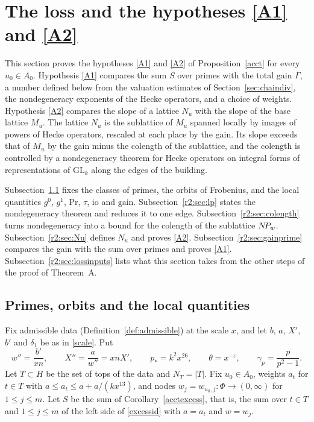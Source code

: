 
\section{The loss and the hypotheses \texorpdfstring{\eqref{A1} and \eqref{A2}}{(3.1) and (3.2)}}\label{r2:sec:loss}

This section proves the hypotheses \eqref{A1} and \eqref{A2} of Proposition~\ref{acct} for every $u_0\in A_0$. Hypothesis \eqref{A1} compares the sum $S$ over primes with the total gain $\Gamma$, a number defined below from the valuation estimates of Section~\ref{sec:chaindiv}, the nondegeneracy exponents of the Hecke operators, and a choice of weights. Hypothesis \eqref{A2} compares the slope of a lattice $N_u$ with the slope of the base lattice $M_u$. The lattice $N_u$ is the sublattice of $M_u$ spanned locally by images of powers of Hecke operators, rescaled at each place by the gain. Its slope exceeds that of $M_u$ by the gain minus the colength of the sublattice, and the colength is controlled by a nondegeneracy theorem for Hecke operators on integral forms of representations of $\mathrm{GL}_k$ along the edges of the building.

Subsection~\ref{r2:sec:loss-setting} fixes the classes of primes, the orbits of Frobenius, and the local quantities $g^0$, $g^1$, $\mathrm{Pr}$, $\tau$, $\mathrm{io}$ and $\mathrm{gain}$. Subsection~\ref{r2:sec:lp} states the nondegeneracy theorem and reduces it to one edge. Subsection~\ref{r2:sec:colength} turns nondegeneracy into a bound for the colength of the sublattice $N\!P_w$. Subsection~\ref{r2:sec:Nu} defines $N_u$ and proves \eqref{A2}. Subsection~\ref{r2:sec:gainprime} compares the gain with the sum over primes and proves \eqref{A1}. Subsection~\ref{r2:sec:lossinputs} lists what this section takes from the other steps of the proof of Theorem~A.

\subsection{Primes, orbits and the local quantities}\label{r2:sec:loss-setting}

Fix admissible data (Definition~\ref{def:admissible}) at the scale $x$, and let $b$, $a$, $X'$, $b'$ and $\delta_1$ be as in \eqref{scale}. Put
\begin{equation}\label{r2:scales}
w''=\frac{b'}{xn},\qquad X''=\frac a{w''}=xnX',\qquad p_*=k^2x^{26},\qquad \theta=x^{-\varepsilon},\qquad \gamma_p=\frac p{p^2-1}.
\end{equation}
Let $T\subset H$ be the set of tops of the data and $N_T=\lvert T\rvert$. Fix $u_0\in A_0$, weights $a_t$ for $t\in T$ with $a\le a_t\le a+a/(kx^{13})$, and nodes $w_j=w_{u_0,j}\colon\Phi\to(0,\infty)$ for $1\le j\le m$. Let $S$ be the sum of Corollary~\ref{acctexcess}, that is, the sum over $t\in T$ and $1\le j\le m$ of the left side of \eqref{excessid} with $a=a_t$ and $w=w_j$.

